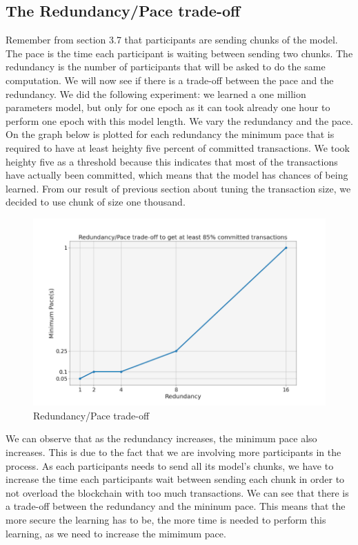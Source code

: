\documentclass{article}
\begin{document}
\subsection{The Redundancy/Pace trade-off}
Remember from section 3.7 that participants are sending chunks of the model. The pace is the time each participant is
waiting between sending two chunks. The redundancy is the number of participants that will be asked to do the same
computation. We will now see if there is a trade-off between the pace and the redundancy. We did the following experiment:
we learned a one million parameters model, but only for one epoch as it can took already one hour to perform one epoch with
this model length. We vary the redundancy and the pace. On the graph below is plotted for each
redundancy the minimum pace that is required to have at least heighty five percent of committed transactions. We took
heighty five as a threshold because this indicates that most of the transactions have actually been committed, which
means that the model has chances of being learned. From our result of previous section about tuning the
transaction size, we decided to use chunk of size one thousand.
\begin{figure}[H]
    \hspace*{-2cm}
        \includegraphics[scale=0.75]{redundancy_pace}
    \hspace{2mm}%
    \caption{Redundancy/Pace trade-off}
\end{figure}
We can observe that as the redundancy increases, the minimum pace also increases. This is due to the fact that we are involving more participants in the process. As each participants needs to send all its model's chunks, we have to increase the time each participants wait between sending each chunk in order to not overload the blockchain with too much transactions. We can see that there is a trade-off between the redundancy and the mininum pace. This means that the more secure the learning has to be, the more time is needed to perform this learning, as we need to increase the mimimum pace.
\end{document}
